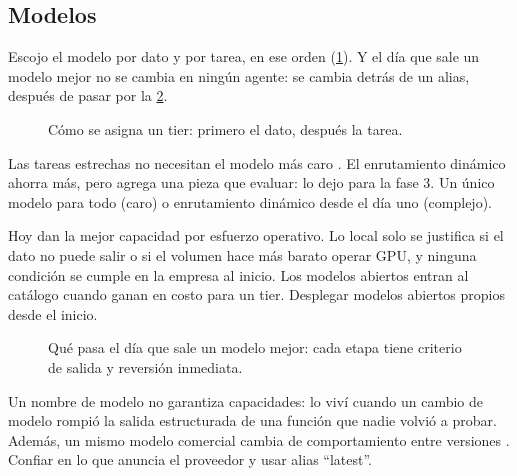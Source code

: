 \subsection{Modelos}
\label{sec:modelos}
Escojo el modelo por dato y por tarea, en ese orden (\cref{fig:modelos}). Y el día que sale
un modelo mejor no se cambia en ningún agente: se cambia detrás de un alias, después de
pasar por la \cref{fig:cambiomodelo}.
\begin{figure}[!htbp]
  \centering
  
  \caption{Cómo se asigna un tier: primero el dato, después la tarea.}
  \label{fig:modelos}
\end{figure}

{Las tareas estrechas no necesitan el modelo más caro \citep{chen2023frugalgpt,ong2025routellm}.
El enrutamiento dinámico ahorra más, pero agrega una pieza que evaluar: lo dejo para la
fase 3.}
{Un único modelo para todo (caro) o enrutamiento dinámico desde el día uno (complejo).}

{Hoy dan la mejor capacidad por esfuerzo operativo. Lo local solo se justifica si el dato no
puede salir o si el volumen hace más barato operar GPU, y ninguna condición se cumple en la empresa
al inicio. Los modelos abiertos entran al catálogo cuando ganan en costo para un tier.}
{Desplegar modelos abiertos propios desde el inicio.}

\begin{figure}[!htbp]
  \centering
  
  \caption{Qué pasa el día que sale un modelo mejor: cada etapa tiene criterio de salida y
  reversión inmediata.}
  \label{fig:cambiomodelo}
\end{figure}

{Un nombre de modelo no garantiza capacidades: lo viví cuando un cambio de modelo rompió la salida
estructurada de una función que nadie volvió a probar. Además, un mismo modelo comercial cambia de comportamiento entre versiones
\citep{chen2024drift}.}
{Confiar en lo que anuncia el proveedor y usar alias ``latest''.}


